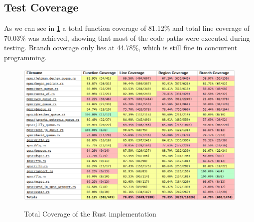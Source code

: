 \subsection{Test Coverage}
As we can see in \cref{fig:cov} a total function coverage of 81.12\% and total line coverage of 70.03\% was achieved, showing that most of the code paths were executed during testing. Branch coverage only lies at 44.78\%, which is still fine in concurrent programming.
\begin{figure}[!ht]
    \centering
    \captionsetup{justification=centering}
    \caption{Total Coverage of the Rust implementation}
    \includegraphics[width=145mm]{images/coverage.png}
    \label{fig:cov}
\end{figure}
